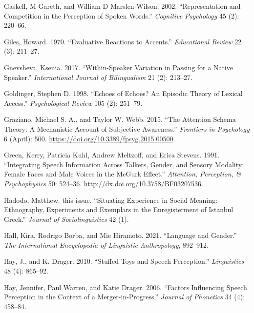 \documentclass[
  letterpaper,
  DIV=11,
  numbers=noendperiod]{scrartcl}
\newlength{\cslhangindent}
\newenvironment{CSLReferences}[2] %
 {\begin{list}{}{%
  \setlength{\itemindent}{0pt}
  \setlength{\leftmargin}{0pt}
  \setlength{\parsep}{0pt}
  \ifodd #1
   \setlength{\leftmargin}{\cslhangindent}
   \setlength{\itemindent}{-1\cslhangindent}
  \fi
  \setlength{\itemsep}{#2\baselineskip}}}
 {\end{list}}
\begin{document}
\begin{CSLReferences}{1}{0}
Gaskell, M Gareth, and William D Marslen-Wilson. 2002. {``Representation
and Competition in the Perception of Spoken Words.''} \emph{Cognitive
Psychology} 45 (2): 220--66.

Giles, Howard. 1970. {``Evaluative Reactions to Accents.''}
\emph{Educational Review} 22 (3): 211--27.

Gnevsheva, Ksenia. 2017. {``Within-Speaker Variation in Passing for a
Native Speaker.''} \emph{International Journal of Bilingualism} 21 (2):
213--27.

Goldinger, Stephen D. 1998. {``Echoes of Echoes? An Episodic Theory of
Lexical Access.''} \emph{Psychological Review} 105 (2): 251--79.

Graziano, Michael S. A., and Taylor W. Webb. 2015. {``The Attention
Schema Theory: A Mechanistic Account of Subjective Awareness.''}
\emph{Frontiers in Psychology} 6 (April): 500.
\url{https://doi.org/10.3389/fpsyg.2015.00500}.

Green, Kerry, Patricia Kuhl, Andrew Meltzoff, and Erica Stevens. 1991.
{``Integrating Speech Information Across Talkers, Gender, and Sensory
Modality: Female Faces and Male Voices in the McGurk Effect.''}
\emph{Attention, Perception, \& Psychophysics} 50: 524--36.
\url{http://dx.doi.org/10.3758/BF03207536}.

Hadodo, Matthew. this issue. {``Situating Experience in Social Meaning:
Ethnography, Experiments and Exemplars in the Enregisterment of Istanbul
Greek.''} \emph{Journal of Sociolinguistics} 42 (1).

Hall, Kira, Rodrigo Borba, and Mie Hiramoto. 2021. {``Language and
Gender.''} \emph{The International Encyclopedia of Linguistic
Anthropology}, 892--912.

Hay, J., and K. Drager. 2010. {``Stuffed Toys and Speech Perception.''}
\emph{Linguistics} 48 (4): 865--92.

Hay, Jennifer, Paul Warren, and Katie Drager. 2006. {``Factors
Influencing Speech Perception in the Context of a Merger-in-Progress.''}
\emph{Journal of Phonetics} 34 (4): 458--84.


\end{CSLReferences}
\end{document}
